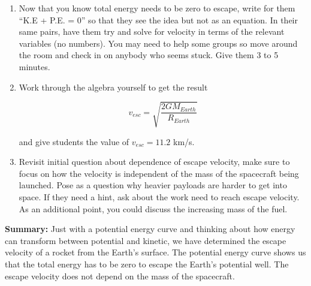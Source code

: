 \documentclass{article}
\begin{document}
\begin{enumerate}
\item Now that you know total energy needs to be zero to escape, write for them ``K.E + P.E. = 0'' so that they see the idea but not as an equation. In their same pairs, have them try and solve for velocity in terms of the relevant variables (no numbers). You may need to help some groups so move around the room and check in on anybody who seems stuck. Give them 3 to 5 minutes.

\item Work through the algebra yourself to get the result

\begin{equation}
v_{esc} = \sqrt{\frac{2 G M_{Earth}}{R_{Earth}}}
\end{equation}

and give students the value of $v_{esc} = 11.2$ km/s.

\item Revisit initial question about dependence of escape velocity, make sure to focus on how the velocity is independent of the mass of the spacecraft being launched. Pose as a question why heavier payloads are harder to get into space. If they need a hint, ask about the work need to reach escape velocity. As an additional point, you could discuss the increasing mass of the fuel.
\end{enumerate}

\textbf{Summary:} Just with a potential energy curve and thinking about how energy can transform between potential and kinetic, we have determined the escape velocity of a rocket from the Earth's surface. The potential energy curve shows us that the total energy has to be zero to escape the Earth's potential well. The escape velocity does not depend on the mass of the spacecraft.

\hspace{14pt}
\end{document}
